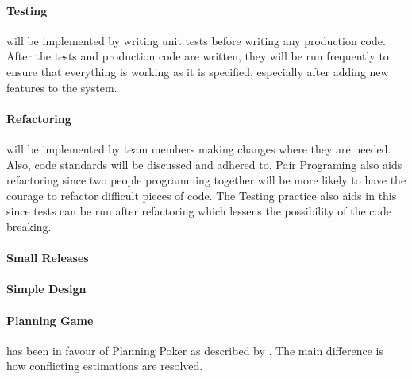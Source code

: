 \paragraph{Testing} will be implemented by writing unit tests before writing any production code. After the tests and production code are written, they will be run frequently to ensure that everything is working as it is specified, especially after adding new features to the system.

\paragraph{Refactoring} will be implemented by team members making changes where they are needed. Also, code standards will be discussed and adhered to. Pair Programing also aids refactoring since two people programming together will be more likely to have the courage to refactor difficult pieces of code. The Testing practice also aids in this since tests can be run after refactoring which lessens the possibility of the code breaking.

\paragraph{Small Releases} %

\paragraph{Simple Design}%


\paragraph{Planning Game} has been in favour of Planning Poker as described by \citet{xp:planningPoker}.
The main difference is how conflicting estimations are resolved. 

